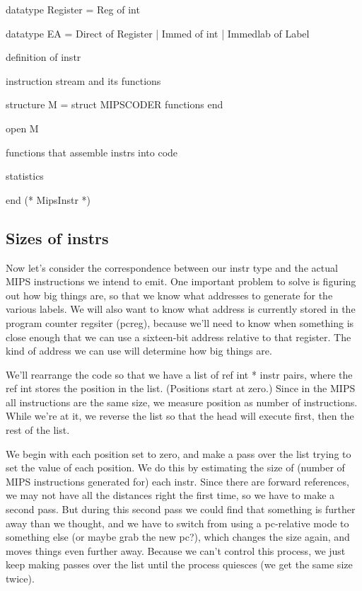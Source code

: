   datatype Register = Reg of int

  datatype EA = Direct of Register
              | Immed of int
              | Immedlab of Label

  \LA{}definition of \code{}instr\edoc{}\RA{}

  \LA{}instruction stream and its functions\RA{}
  
  structure M = struct
    \LA{}\code{}MIPSCODER\edoc{} functions\RA{}
  end

  open M

  \LA{}functions that assemble \code{}instr\edoc{}s into code\RA{}

  \LA{}statistics\RA{}

end (* MipsInstr *)
\endcode
{}
\subsection{Sizes of \code{}instr\edoc{}s}
Now let's consider the correspondence between our \code{}instr\edoc{} type and the
actual MIPS instructions we intend to emit.
One important problem to solve is figuring out how big things are, 
so that we know what addresses to generate for the various labels.
We will also want to know what address is currently stored in the program
counter regsiter (\code{}pcreg\edoc{}),
because we'll need to know when something is close 
enough that we can use a sixteen-bit address relative to that register.
The kind of address we can use will determine how big things are.

We'll rearrange the code so that we have a list of \code{}ref int * instr\edoc{} pairs,
where the \code{}ref int\edoc{} stores the position in the list. 
(Positions start at zero.)
Since in the MIPS all instructions are the same size, we measure
position as number of instructions.
While we're at it, we reverse the list so that the head will execute first,
then the rest of the list.

We begin with each position set to zero, and make a pass over the list 
trying to set the value of each position. 
We do this by estimating the size of (number of MIPS instructions 
generated for) each \code{}instr\edoc{}.
Since there are forward references, we may not have all the distances right
the first time, so we have to make a second pass.
But during this second pass we could find that something is further
away than we thought, and we have to switch from using a pc-relative mode to
something else (or maybe grab the new pc?), which changes the size again,
and moves things even further away.
Because we can't control this process, we just keep making passes over the
list until the process quiesces (we get the same size twice).

